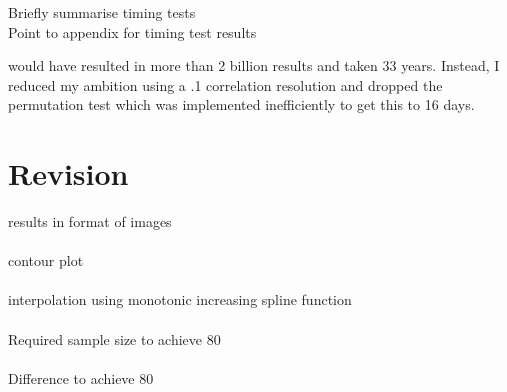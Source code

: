 Briefly summarise timing tests
\\
Point to appendix for timing test results

would have resulted in more than 2 billion results and taken 33 years.  Instead, I reduced my ambition using a .1 correlation resolution and dropped the permutation test which was implemented inefficiently to get this to 16 days.

\section{Revision}
  
results in format of images
\\
\\
contour plot
\\
\\  
interpolation using monotonic increasing spline function
\\
\\
Required sample size to achieve 80%
\\
\\  
Difference to achieve 80%

